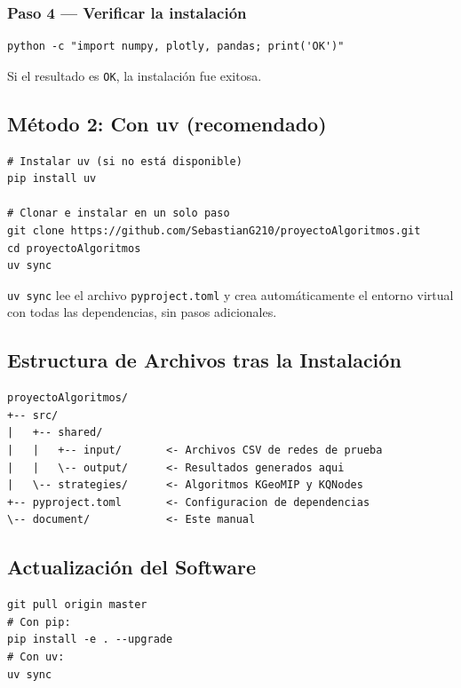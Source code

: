 \subsubsection{Paso 4 — Verificar la instalación}

\begin{lstlisting}[style=shell, caption={Verificar que las dependencias están instaladas correctamente.}]
python -c "import numpy, plotly, pandas; print('OK')"
\end{lstlisting}

Si el resultado es \lstinline|OK|, la instalación fue exitosa.

\subsection{Método 2: Con uv (recomendado)}

\begin{lstlisting}[style=shell, caption={Instalación rápida con uv.}]
# Instalar uv (si no está disponible)
pip install uv

# Clonar e instalar en un solo paso
git clone https://github.com/SebastianG210/proyectoAlgoritmos.git
cd proyectoAlgoritmos
uv sync
\end{lstlisting}

\begin{tip}
\lstinline|uv sync| lee el archivo \lstinline|pyproject.toml| y crea automáticamente el entorno virtual con todas las dependencias, sin pasos adicionales.
\end{tip}

\subsection{Estructura de Archivos tras la Instalación}

\begin{lstlisting}[caption={Estructura relevante del proyecto después de instalar.}]
proyectoAlgoritmos/
+-- src/
|   +-- shared/
|   |   +-- input/       <- Archivos CSV de redes de prueba
|   |   \-- output/      <- Resultados generados aqui
|   \-- strategies/      <- Algoritmos KGeoMIP y KQNodes
+-- pyproject.toml       <- Configuracion de dependencias
\-- document/            <- Este manual
\end{lstlisting}

\subsection{Actualización del Software}

\begin{lstlisting}[style=shell, caption={Actualizar a la versión más reciente.}]
git pull origin master
# Con pip:
pip install -e . --upgrade
# Con uv:
uv sync
\end{lstlisting}
